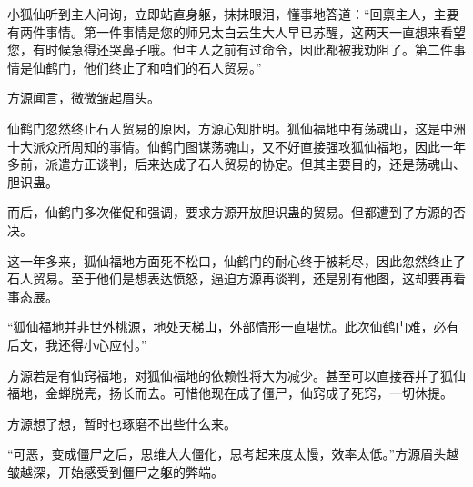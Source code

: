 \begin{this_body}
小狐仙听到主人问询，立即站直身躯，抹抹眼泪，懂事地答道：“回禀主人，主要有两件事情。第一件事情是您的师兄太白云生大人早已苏醒，这两天一直想来看望您，有时候急得还哭鼻子哦。但主人之前有过命令，因此都被我劝阻了。第二件事情是仙鹤门，他们终止了和咱们的石人贸易。”

方源闻言，微微皱起眉头。

仙鹤门忽然终止石人贸易的原因，方源心知肚明。狐仙福地中有荡魂山，这是中洲十大派众所周知的事情。仙鹤门图谋荡魂山，又不好直接强攻狐仙福地，因此一年多前，派遣方正谈判，后来达成了石人贸易的协定。但其主要目的，还是荡魂山、胆识蛊。

而后，仙鹤门多次催促和强调，要求方源开放胆识蛊的贸易。但都遭到了方源的否决。

这一年多来，狐仙福地方面死不松口，仙鹤门的耐心终于被耗尽，因此忽然终止了石人贸易。至于他们是想表达愤怒，逼迫方源再谈判，还是别有他图，这却要再看事态展。

“狐仙福地并非世外桃源，地处天梯山，外部情形一直堪忧。此次仙鹤门难，必有后文，我还得小心应付。”

方源若是有仙窍福地，对狐仙福地的依赖性将大为减少。甚至可以直接吞并了狐仙福地，金蝉脱壳，扬长而去。可惜他现在成了僵尸，仙窍成了死窍，一切休提。

方源想了想，暂时也琢磨不出些什么来。

“可恶，变成僵尸之后，思维大大僵化，思考起来度太慢，效率太低。”方源眉头越皱越深，开始感受到僵尸之躯的弊端。

\end{this_body}

